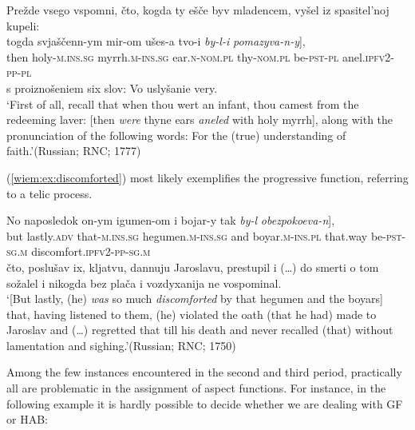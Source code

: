 \documentclass[output=paper]{langscibook}
\begin{document}
\ea\label{wiem:ex:aneled}
{Prežde vsego vspomni, čto, kogda ty ešče byv mladencem, vyšel iz spasitel’noj kupeli:}\\ 
\gll \minsp{[} {togda} {svjaščenn-ym} {mir-om} {ušes-a} {tvo-i} {\textit{by-l-i}} {\textit{pomazyva-n-y}}],\\
{} then holy-\textsc{m.ins.sg} myrrh.\textsc{m-ins.sg} ear.\textsc{n-nom.pl} thy-\textsc{nom.pl} be-\textsc{pst-pl} anel.\textsc{ipfv2-pp-pl}\\
{s proiznošeniem six slov: Vo uslyšanie very.}\\
\glt ‘First of all, recall that when thou wert an infant, thou camest from the redeeming laver: [then \textit{were} thyne ears \textit{aneled} with holy myrrh], along with the pronunciation of the following words: For the (true) understanding of faith.’\hfill (Russian; RNC; 1777)
\z

\noindent (\ref{wiem:ex:discomforted}) most likely exemplifies the progressive function, referring to a telic process.\largerpage[1.5]

\ea\label{wiem:ex:discomforted}
\gll \minsp{[} {No} {naposledok} {on-ym} {igumen-om} {i} {bojar-y} {tak} {\textit{by-l}} {\textit{obezpokoeva-n}}],\\
{} but lastly.\textsc{adv} that-\textsc{m.ins.sg} hegumen.\textsc{m-ins.sg} and boyar.\textsc{m}-\textsc{ins.pl} that.way be-\textsc{pst-sg.m} discomfort.\textsc{ipfv2-pp-sg.m}\\
{čto, poslušav ix, kljatvu, dannuju Jaroslavu, prestupil i (…) do smerti o tom sožalel i nikogda bez plača i vozdyxanija ne vospominal.}\\
\glt ‘[But lastly, (he) \textit{was} so much \textit{discomforted} by that hegumen and the boyars] that, having listened to them, (he) violated the oath (that he had) made to Jaroslav and (…) regretted that till his death and never recalled (that) without lamentation and sighing.’\hfill (Russian; RNC; 1750)
\z

\noindent Among the few instances encountered in the second and third period, practically all are problematic in the assignment of aspect functions. For instance, in the following example it is hardly possible to decide whether we are dealing with GF or HAB:

\z
\end{document}
